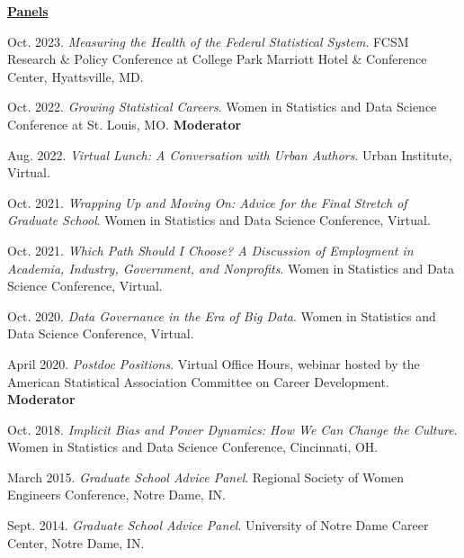 \underline{\textbf{\large Panels}}\normalsize
\vspace{4pt}
\begin{etaremune}[topsep=0pt, itemsep=3pt, partopsep=0pt, parsep=0pt]
    \item Oct. 2023. \textit{Measuring the Health of the Federal Statistical System}. FCSM Research \& Policy Conference at College Park Marriott Hotel \& Conference Center, Hyattsville, MD.
    
    \item Oct. 2022. \textit{Growing Statistical Careers}. Women in Statistics and Data Science Conference at St. Louis, MO. \textbf{Moderator}
    
    \item Aug. 2022. \textit{Virtual Lunch: A Conversation with Urban Authors}. Urban Institute, Virtual.
    
    \item Oct. 2021. \textit{Wrapping Up and Moving On: Advice for the Final Stretch of Graduate School}. Women in Statistics and Data Science Conference, Virtual.
    
    \item Oct. 2021. \textit{Which Path Should I Choose? A Discussion of Employment in Academia, Industry, Government, and Nonprofits}. Women in Statistics and Data Science Conference, Virtual.
    
    \item Oct. 2020. \textit{Data Governance in the Era of Big Data}. Women in Statistics and Data Science Conference, Virtual.
    
    \item April 2020. \textit{Postdoc Positions}. Virtual Office Hours, webinar hosted by the American Statistical Association Committee on Career Development. \textbf{Moderator}
    
    \item Oct. 2018. \textit{Implicit Bias and Power Dynamics: How We Can Change the Culture}. Women in Statistics and Data Science Conference, Cincinnati, OH.

    \item March 2015. \textit{Graduate School Advice Panel}.  Regional Society of Women Engineers Conference, Notre Dame, IN.
    
    \item Sept. 2014. \textit{Graduate School Advice Panel}.  University of Notre Dame Career Center, Notre Dame, IN.
    

\end{etaremune}
